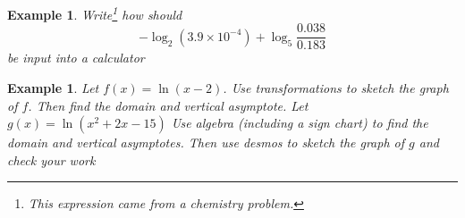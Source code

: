 \documentclass[twoside]{tufte-handout}
\newcounter{ekcounter}%
\theoremstyle{ekimcustom}
\newtheorem{exm}[ekcounter]{Example}
\begin{document}
\vskip10pt

\begin{exm}
Write\footnote{This expression came from a chemistry problem.} how should 
$$-\log_2(3.9 \times 10^{-4}) + \log_5 \dfrac{0.038}{0.183}$$
be input into a calculator
\end{exm}

%
%







\everymath{\displaystyle}

\begin{exm}{Let $f(x)=\ln(x-2)$. Use transformations to sketch the graph of $f$.
    Then find the domain and vertical asymptote. Let $g(x)=\ln(x^2+2x-15)$ 
    Use algebra (including a sign chart) to find the domain and vertical asymptotes.
    Then use desmos to sketch the graph of $g$ and check your work}
\end{exm}\vskip10pt
\end{document}
